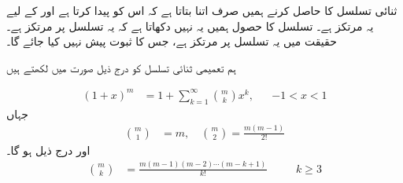 ثنائی تسلسل کا  حاصل کرنے  ہمیں صرف اتنا بتاتا ہے کہ   اس کو پیدا کرتا ہے اور  کے لیے یہ   مرتکز ہے۔ تسلسل کا حصول ہمیں یہ نہیں دکھاتا ہے کہ یہ تسلسل  پر مرتکز ہے۔ حقیقت میں یہ تسلسل  پر مرتکز ہے، جس کا ثبوت پیش نہیں کیا جائے گا۔

ہم  تعمیمی ثنائی تسلسل کو  درج ذیل صورت میں   لکھتے ہیں

\begin{align}\label{مساوات_تسلسل_ثنائی_علامتیں_الف}
(1+x)^m&=1+\sum_{k=1}^{\infty}\binom{m}{k}x^k,&&-1<x<1
\end{align}
جہاں
\begin{align*}
\binom{m}{1}&=m,\quad \binom{m}{2}=\frac{m(m-1)}{2!}
\end{align*}
اور درج ذیل  ہو گا۔
\begin{align*}
\binom{m}{k}&=\frac{m(m-1)(m-2)\cdots(m-k+1)}{k!}&&\quad k\ge 3
\end{align*}


